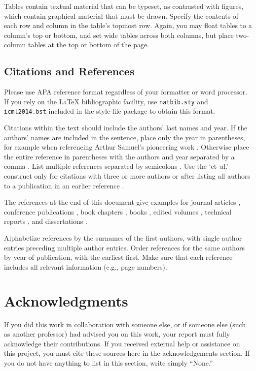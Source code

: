 \documentclass{article}
\begin{document}
Tables contain textual material that can be typeset, as contrasted 
with figures, which contain graphical material that must be drawn. 
Specify the contents of each row and column in the table's topmost
row. Again, you may float tables to a column's top or bottom, and set
wide tables across both columns, but place two-column tables at the
top or bottom of the page.
 
\subsection{Citations and References} 

Please use APA reference format regardless of your formatter
or word processor. If you rely on the \LaTeX\/ bibliographic 
facility, use {\tt natbib.sty} and {\tt icml2014.bst} 
included in the style-file package to obtain this format.

Citations within the text should include the authors' last names and
year. If the authors' names are included in the sentence, place only
the year in parentheses, for example when referencing Arthur Samuel's
pioneering work . Otherwise place the entire
reference in parentheses with the authors and year separated by a
comma \cite{Samuel59}. List multiple references separated by
semicolons \cite{kearns89,Samuel59,mitchell80}. Use the `et~al.'
construct only for citations with three or more authors or after
listing all authors to a publication in an earlier reference \cite{MachineLearningI}.

The references at the end of this document give examples for journal
articles \cite{Samuel59}, conference publications \cite{langley00}, book chapters \cite{Newell81}, books \cite{DudaHart2nd}, edited volumes \cite{MachineLearningI}, 
technical reports \cite{mitchell80}, and dissertations \cite{kearns89}. 

Alphabetize references by the surnames of the first authors, with
single author entries preceding multiple author entries. Order
references for the same authors by year of publication, with the
earliest first. Make sure that each reference includes all relevant
information (e.g., page numbers).

\section*{Acknowledgments} 
 
If you did this work in collaboration with someone else, or if someone else (such as another professor) had advised you on this work, your report must fully acknowledge their contributions. If you received external help or assistance on this project, you must cite these sources here in the acknowledgements section.  If you do not have anything to list in this section, write simply ``None.''



\end{document}
